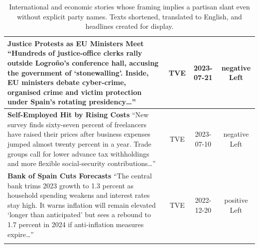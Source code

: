 \documentclass[12pt]{article}
\begin{document}
\begin{center}
\begin{longtable}{|p{8cm}|c|c|c|}
	\textbf{Justice Protests as EU Ministers Meet}\newline
	{\scriptsize“Hundreds of justice-office clerks rally outside Logroño’s conference hall, accusing the government of ‘stonewalling’.  Inside, EU ministers debate cyber-crime, organised crime and victim protection under Spain’s rotating presidency…”}
	& TVE & 2023-07-21 & negative Left\\
	\hline
	
	\textbf{Self-Employed Hit by Rising Costs}\newline
	{\scriptsize“New survey finds sixty-seven percent of freelancers have raised their prices after business expenses jumped almost twenty percent in a year.  Trade groups call for lower advance tax withholdings and more flexible social-security contributions…”}
	& TVE & 2023-07-10 & negative Left\\
	\hline
	
	\textbf{Bank of Spain Cuts Forecasts}\newline
	{\scriptsize“The central bank trims 2023 growth to 1.3 percent as household spending weakens and interest rates stay high.  It warns inflation will remain elevated ‘longer than anticipated’ but sees a rebound to 1.7 percent in 2024 if anti-inflation measures expire…”}
	& TVE & 2022-12-20 & positive Left\\
	\hline
	
	\caption*{International and economic stories whose framing implies a partisan slant even without explicit party names.  Texts shortened, translated to English, and headlines created for display.}
	\label{tab:international}
\end{longtable}

\end{center}
\end{document}
